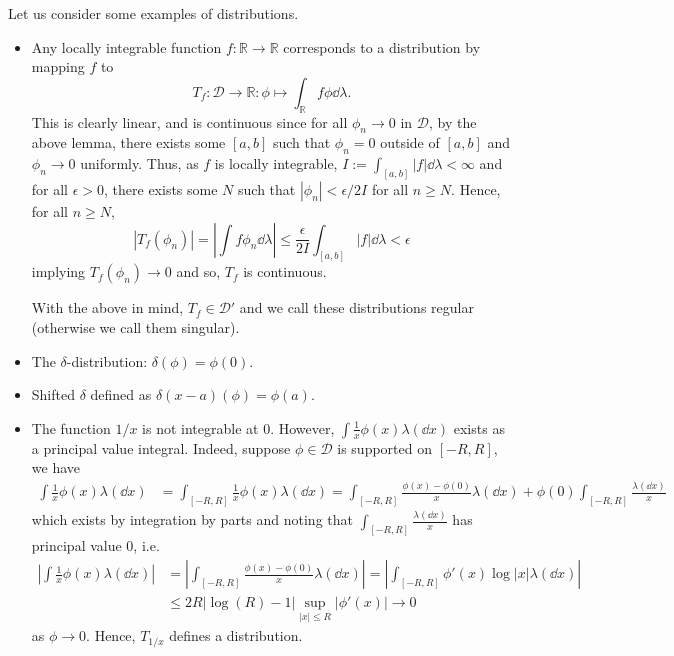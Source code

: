\documentclass[]{article}
\theoremstyle{definition}
\theoremstyle{definition}
\begin{document}
Let us consider some examples of distributions. 
\begin{itemize}
  \item Any locally integrable function \(f : \mathbb{R} \to \mathbb{R}\) 
    corresponds to a distribution by mapping \(f\) to 
    \[T_f : \mathcal{D} \to \mathbb{R} : \phi \mapsto \int_{\mathbb{R}} f\phi \dd \lambda.\]
    This is clearly linear, and is continuous since for all \(\phi_n \to 0\) in 
    \(\mathcal{D}\), by the above lemma, there exists some \([a, b]\) such that 
    \(\phi_n = 0\) outside of \([a, b]\) and \(\phi_n \to 0\) uniformly. 
    Thus, as \(f\) is locally integrable, \(I := \int_{[a, b]} |f| \dd \lambda < \infty\) 
    and for all \(\epsilon > 0\), there exists some \(N\) such that \(|\phi_n| < \epsilon / 2I\) 
    for all \(n \ge N\). Hence, for all \(n \ge N\),
    \[|T_f(\phi_n)| = \left|\int f \phi_n \dd \lambda \right|
      \le \frac{\epsilon}{2I}\int_{[a, b]} |f|\dd \lambda < \epsilon\]
    implying \(T_f(\phi_n) \to 0\) and so, \(T_f\) is continuous.

    With the above in mind, \(T_f \in \mathcal{D}'\) and we call these distributions 
    regular (otherwise we call them singular).  
  \item The \(\delta\)-distribution: \(\delta(\phi) = \phi(0)\).
  \item Shifted \(\delta\) defined as \(\delta(x - a)(\phi) = \phi(a)\).
  \item The function \(1 / x\) is not integrable at 0. However, 
  \(\int \frac{1}{x} \phi(x) \lambda(\dd x)\) exists as a principal value integral. 
  Indeed, suppose \(\phi \in \mathcal{D}\) is supported on \([-R, R]\), we have 
  \[\begin{split}
    \int \frac{1}{x}\phi(x) \lambda(\dd x) & = \int_{[-R, R]} \frac{1}{x} \phi(x) \lambda(\dd x) 
      = \int_{[-R, R]} \frac{\phi(x) - \phi(0)}{x} \lambda(\dd x) + 
        \phi(0) \int_{[-R, R]} \frac{\lambda(\dd x)}{x}
  \end{split}\]
  which exists by integration by parts and noting that 
  \(\int_{[-R, R]} \frac{\lambda(\dd x)}{x}\) has principal value 0, i.e.  
  \[\begin{split}
  \left|\int \frac{1}{x}\phi(x) \lambda(\dd x)\right| & = 
  \left|\int_{[-R, R]} \frac{\phi(x) - \phi(0)}{x} \lambda(\dd x)\right| = 
  \left|\int_{[-R, R]} \phi'(x) \log|x| \lambda(\dd x)\right|\\
  & \le 2R |\log(R) - 1| \sup_{|x| \le R} |\phi'(x)| \to 0
  \end{split}\]
  as \(\phi \to 0\). Hence, \(T_{1 / x}\) defines a distribution.
\end{itemize}
\end{document}
